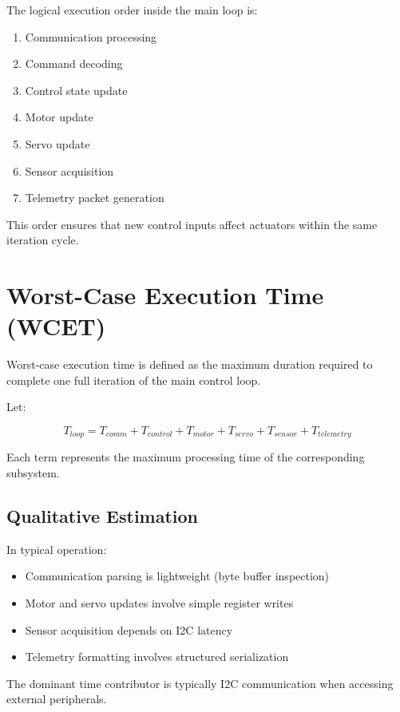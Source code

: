 The logical execution order inside the main loop is:

\begin{enumerate}
	\item Communication processing
	\item Command decoding
	\item Control state update
	\item Motor update
	\item Servo update
	\item Sensor acquisition
	\item Telemetry packet generation
\end{enumerate}

This order ensures that new control inputs affect actuators within the same iteration cycle.


\section{Worst-Case Execution Time (WCET)}

Worst-case execution time is defined as the maximum duration required to complete one full iteration of the main control loop.

Let:

\[
T_{loop} = T_{comm} + T_{control} + T_{motor} + T_{servo} + T_{sensor} + T_{telemetry}
\]

Each term represents the maximum processing time of the corresponding subsystem.

\subsection{Qualitative Estimation}

In typical operation:

\begin{itemize}
	\item Communication parsing is lightweight (byte buffer inspection)
	\item Motor and servo updates involve simple register writes
	\item Sensor acquisition depends on I2C latency
	\item Telemetry formatting involves structured serialization
\end{itemize}

The dominant time contributor is typically I2C communication when accessing external peripherals.


